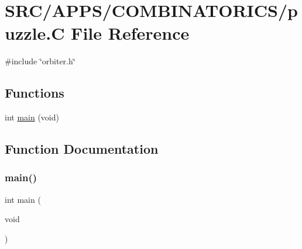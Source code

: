 \hypertarget{puzzle_8_c}{}\section{S\+R\+C/\+A\+P\+P\+S/\+C\+O\+M\+B\+I\+N\+A\+T\+O\+R\+I\+C\+S/puzzle.C File Reference}
\label{puzzle_8_c}
{\ttfamily \#include \char`\"{}orbiter.\+h\char`\"{}}\newline
\subsection*{Functions}
\begin{DoxyCompactItemize}
\item 
int \mbox{\hyperlink{puzzle_8_c_a840291bc02cba5474a4cb46a9b9566fe}{main}} (void)
\end{DoxyCompactItemize}


\subsection{Function Documentation}
\mbox{\label{puzzle_8_c_a840291bc02cba5474a4cb46a9b9566fe}} 
\subsubsection{\texorpdfstring{main()}{main()}}
{\footnotesize\ttfamily int main (\begin{DoxyParamCaption}\item[{void}]{ }\end{DoxyParamCaption})}

